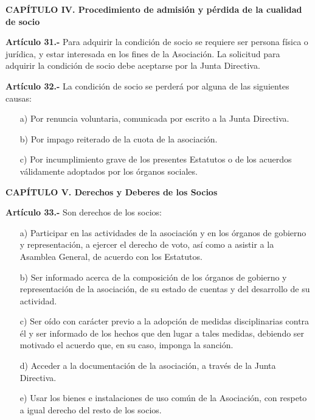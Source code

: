 \documentclass[a4paper,12pt]{article}
\begin{document}
\begin{onehalfspace}
\bigskip\bigskip

\begin{center}
\textbf{CAPÍTULO IV. Procedimiento de admisión y pérdida de la cualidad de socio}
\end{center}

\bigskip\bigskip

\textbf{Artículo 31.-} Para adquirir la condición de socio se requiere ser persona física o jurídica, y estar interesada en los fines de la Asociación. La solicitud para adquirir la condición de socio debe aceptarse por la Junta Directiva.

\bigskip\bigskip

\textbf{Artículo 32.-} La condición de socio se perderá por alguna de las siguientes causas:
\begin{itemize}
\item [a)] Por renuncia voluntaria, comunicada por escrito a la Junta Directiva.
\item [b)] Por impago reiterado de la cuota de la asociación.
\item [c)] Por incumplimiento grave de los presentes Estatutos o de los acuerdos válidamente adoptados por los órganos sociales.
\end{itemize}

\bigskip\bigskip
\newpage
\begin{center}
\textbf{CAPÍTULO V. Derechos y Deberes de los Socios}
\end{center}

\bigskip\bigskip

\textbf{Artículo 33.-} Son derechos de los socios:
\begin{itemize}
\item [a)] Participar en las actividades de la asociación y en los órganos de gobierno y representación, a ejercer el derecho de voto, así como a asistir a la Asamblea General, de acuerdo con los Estatutos.
\item [b)] Ser informado acerca de la composición de los órganos de gobierno y representación de la asociación, de su estado de cuentas y del desarrollo de su actividad.
\item [c)] Ser oído con carácter previo a la adopción de medidas disciplinarias contra él y ser informado de los hechos que den lugar a tales medidas, debiendo ser motivado el acuerdo que, en su caso, imponga la sanción.
\item [d)] Acceder a la documentación de la asociación, a través de la Junta Directiva.
\item [e)] Usar los bienes e instalaciones de uso común de la Asociación, con respeto a igual derecho del resto de los socios.
\end{itemize}


\end{onehalfspace}
\end{document}
